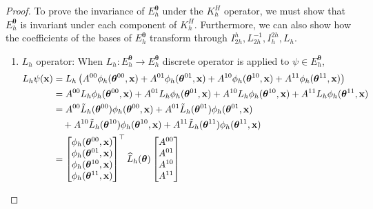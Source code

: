 \documentclass[12pt]{article}
\begin{document}
\begin{proof}
    To prove the invariance of $E^{\boldsymbol{\theta}}_h$ under the $K^H_h$ operator, we must show that $E^{\boldsymbol{\theta}}_h$ is invariant under each component of $K^H_h$. Furthermore, we can also show how the coefficients of the bases of $E^{\boldsymbol{\theta}}_h$ transform through $I^{h}_{2h}, L_{2h}^{-1}, I^{2h}_h, L_h$. 
    \begin{enumerate}
        \item $L_h$ operator: When $L_h : E^{\boldsymbol{\theta}}_h \to E^{\boldsymbol{\theta}}_h$ discrete operator is applied to $\psi \in E^{\boldsymbol{\theta}}_h$, 
\begin{align*}
    L_h \psi(\mathbf{x}) &= L_h \left(A^{00}\phi_h(\boldsymbol{\theta}^{00}, \mathbf{x}) + A^{01}\phi_h(\boldsymbol{\theta}^{01}, \mathbf{x}) + A^{10}\phi_h(\boldsymbol{\theta}^{10}, \mathbf{x}) + A^{11}\phi_h(\boldsymbol{\theta}^{11}, \mathbf{x})\right) \\
    &= A^{00} L_h \phi_h(\boldsymbol{\theta}^{00}, \mathbf{x}) + A^{01}L_h \phi_h(\boldsymbol{\theta}^{01}, \mathbf{x}) + A^{10}L_h \phi_h(\boldsymbol{\theta}^{10}, \mathbf{x}) + A^{11}L_h \phi_h(\boldsymbol{\theta}^{11}, \mathbf{x}) \\
    &= A^{00} \Tilde{L}_h(\boldsymbol{\theta}^{00}) \phi_h(\boldsymbol{\theta}^{00}, \mathbf{x}) +  A^{01}\Tilde{L}_h(\boldsymbol{\theta}^{01}) \phi_h(\boldsymbol{\theta}^{01}, \mathbf{x}) \\
    &\quad + A^{10}\Tilde{L}_h(\boldsymbol{\theta}^{10}) \phi_h(\boldsymbol{\theta}^{10}, \mathbf{x}) + A^{11}\Tilde{L}_h(\boldsymbol{\theta}^{11}) \phi_h(\boldsymbol{\theta}^{11}, \mathbf{x}) \\
    &= \begin{bmatrix}
        \phi_h(\boldsymbol{\theta}^{00}, \mathbf{x})\\
        \phi_h(\boldsymbol{\theta}^{01}, \mathbf{x})\\
        \phi_h(\boldsymbol{\theta}^{10}, \mathbf{x})\\
        \phi_h(\boldsymbol{\theta}^{11}, \mathbf{x})
    \end{bmatrix}^{\top} \widehat{L}_h(\boldsymbol{\theta}) \begin{bmatrix}
        A^{00}\\
        A^{01}\\
        A^{10}\\
        A^{11}
    \end{bmatrix}
\end{align*}

\end{enumerate}
\end{proof}
\end{document}
